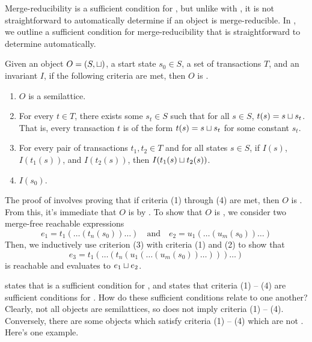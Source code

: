 Merge-reducibility is a sufficient condition for \invariantconfluence{}, but
unlike with \invariantclosure{}, it is not straightforward to automatically
determine if an object is merge-reducible. In , we
outline a sufficient condition for merge-reducibility that is straightforward
to determine automatically.

\begin{theorem}
  Given an object $O = (S, \sqcup)$, a start state $s_0 \in S$, a set of
  transactions $T$, and an invariant $I$, if the following criteria are met,
  then $O$ is \sTIconfluent{}.
  \begin{enumerate}
    \item
      $O$ is a semilattice.

    \item
      For every $t \in T$, there exists some $s_t \in S$ such that for all $s
      \in S$, $t(s) = s \sqcup s_t$. That is, every transaction $t$ is of the
      form $t(s) = s \sqcup s_t$ for some constant $s_t$.

    \item
      For every pair of transactions $t_1, t_2 \in T$ and for all states $s \in
      S$, if $I(s)$, $I(t_1(s))$, and $I(t_2(s))$, then $I(t_1(s) \sqcup
      t_2(s))$.

    \item
      $I(s_0)$.
  \end{enumerate}
\end{theorem}

The proof of  involves proving that if criteria (1)
through (4) are met, then $O$ is \sTImergereducible{}. From this, it's
immediate that $O$ is \sTIconfluent{} by
. To show that $O$ is
\sTImergereducible, we consider two merge-free reachable expressions
\[
  e_1 = t_1(\ldots(t_n(s_0))\ldots)
  \quad\text{and}\quad
  e_2 = u_1(\ldots(u_m(s_0))\ldots)
\]
Then, we inductively use criterion (3) with criteria (1) and (2) to show that
\[
  e_3 = t_1(\ldots(
          t_n(u_1(\ldots(u_m(s_0))\ldots))
        )\ldots)
\]
is reachable and evaluates to $e_1 \sqcup e_2$.

 states that \invariantclosure{} is a
sufficient condition for \invariantconfluence{}, and 
states that criteria (1) -- (4) are sufficient conditions for
\invariantconfluence{}. How do these sufficient conditions relate to one another?
Clearly, not all \invariantclosed{} objects are semilattices, so
\invariantclosure{} does not imply criteria (1) -- (4). Conversely, there are some
objects which satisfy criteria (1) -- (4) which are not \invariantclosed{}. Here's
one example.

